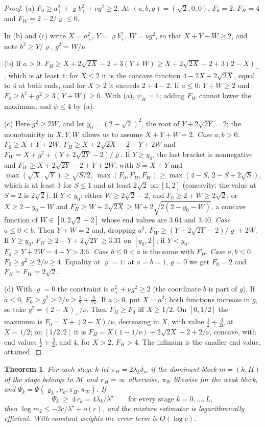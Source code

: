 \documentclass[11pt]{article}
\newtheorem{theorem}{Theorem}
\theoremstyle{definition}
\theoremstyle{remark}
\begin{document}
\begin{proof}
(a) $F_0\ge a_+^2+\varrho b_+^2+\nu g^2\ge2$. At $(a,b,g)=(\sqrt2,0,0)$, $F_0=2$, $F_H=4$ and
$F_W=2-2/\varrho\le0$.

In (b) and (c) write $X=a_+^2$, $Y=\varrho b_+^2$, $W=\nu g^2$, so that $X+Y+W\ge2$, and
note $b^2\ge Y/\varrho$, $g^2=W/\nu$.

(b) If $a>0$: $F_H\ge X+2\sqrt{2X}-2+3(Y+W)\ge X+2\sqrt{2X}-2+3(2-X)_+$, which is at
least $4$: for $X\le2$ it is the concave function $4-2X+2\sqrt{2X}$, equal to $4$ at both
ends, and for $X>2$ it exceeds $2+4-2$. If $a\le0$: $Y+W\ge2$ and
$F_0\ge b^2+g^2\ge3(Y+W)\ge6$. With (a), $\psi_H=4$; adding $F_W$ cannot lower the
maximum, and $\psi\le4$ by (a).

(c) Here $g^2\ge2W$, and let $y_0=(2-\sqrt2)^2$, the root of $Y+2\sqrt{2Y}=2$; the
monotonicity in $X,Y,W$ allows us to assume $X+Y+W=2$.
\emph{Case $a,b>0$.} $F_0\ge X+Y+2W$, $F_H\ge X+2\sqrt{2X}-2+Y+2W$ and
$F_W=X+g^2+(Y+2\sqrt{2Y}-2)/\varrho$. If $Y\ge y_0$, the last bracket is nonnegative and
$F_W\ge X+2\sqrt{2Y}-2+Y+2W$; with $S=X+Y$ and $\max(\sqrt X,\sqrt Y)\ge\sqrt{S/2}$,
$\max(F_0,F_H,F_W)\ge\max(4-S,\,2-S+2\sqrt S)$, which is at least $3$ for $S\le1$ and at
least $2\sqrt2$ on $[1,2]$ (concavity; the value at $S=2$ is $2\sqrt2$). If $Y<y_0$:
either $W\ge2\sqrt2-2$, and $F_0\ge2+W\ge2\sqrt2$, or $X\ge2-y_0-W$ and
$F_H\ge W+2\sqrt{2X}\ge W+2\sqrt{2(2-y_0-W)}$, a concave function of
$W\in[0,2\sqrt2-2]$ whose end values are $3.64$ and $3.40$.
\emph{Case $a\le0<b$.} Then $Y+W=2$ and, dropping $a^2$, $F_W\ge(Y+2\sqrt{2Y}-2)/\varrho+2W$.
If $Y\ge y_0$, $F_W\ge2-Y+2\sqrt{2Y}\ge3.31$ on $[y_0,2]$; if $Y<y_0$,
$F_0\ge Y+2W=4-Y>3.6$. \emph{Case $b\le0<a$} is the same with $F_H$.
\emph{Case $a,b\le0$.} $F_0\ge g^2\ge2/\nu\ge4$.
Equality at $\varrho=1$: at $a=b=1$, $g=0$ we get $F_0=2$ and $F_H=F_W=2\sqrt2$.

(d) With $\varrho=0$ the constraint is $a_+^2+\nu g^2\ge2$ (the coordinate $b$ is part of
$g$). If $a\le0$, $F_0\ge g^2\ge2/\nu\ge\frac12+\frac3{2\nu}$. If $a>0$, put $X=a^2$; both
functions increase in $g$, so take $g^2=(2-X)_+/\nu$. Then $F_H\ge F_0$ iff $X\ge1/2$. On
$[0,1/2]$ the maximum is $F_0=X+(2-X)/\nu$, decreasing in $X$, with value
$\frac12+\frac3{2\nu}$ at $X=1/2$; on $[1/2,2]$ it is $F_H=X(1-1/\nu)+2\sqrt{2X}-2+2/\nu$,
concave, with end values $\frac12+\frac3{2\nu}$ and $4$; for $X>2$, $F_H>4$. The infimum
is the smaller end value, attained.
\end{proof}

\begin{theorem}\label{thm:mixture}
For each stage $k$ let $\pi_H=2\lambda_k\delta_m$ if the dominant block $m=(k,H)$ of the
stage belongs to $\mathcal M$ and $\pi_H=\infty$ otherwise, $\pi_W$ likewise for the weak
block, and $\Psi_k=\Psi(\varrho_k,\nu_k;\pi_H,\pi_W)$. If
\begin{equation}\label{eq:cover}
\Psi_k\ \ge\ 4\,r_k=4\lambda_k/\lambda^\star\qquad\text{for every stage }k=0,\dots,L,
\end{equation}
then $\log m_2\le-2c/\lambda^\star+o(c)$, and the mixture estimator is logarithmically
efficient. With constant weights the error term is $O(\log c)$.
\end{theorem}
\end{document}
